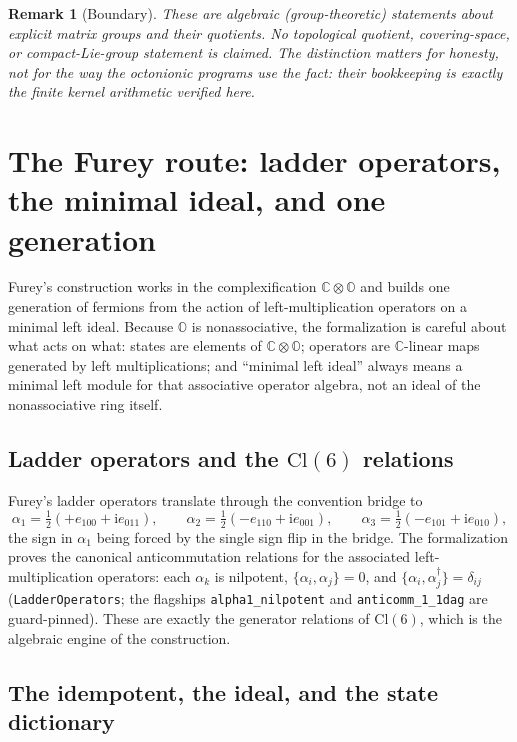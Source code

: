 \documentclass[11pt]{article}
\newcommand{\ii}{\mathrm{i}}
\newcommand{\C}{\mathbb{C}}
\newcommand{\OO}{\mathbb{O}}
\newcommand{\leanname}[1]{\texttt{#1}}
\newtheorem{remark}{Remark}
\begin{document}
\begin{remark}[Boundary]
These are algebraic (group-theoretic) statements about explicit matrix
groups and their quotients.  No topological quotient, covering-space, or
compact-Lie-group statement is claimed.  The distinction matters for
honesty, not for the way the octonionic programs use the fact: their
bookkeeping is exactly the finite kernel arithmetic verified here.
\end{remark}

\section{The Furey route: ladder operators, the minimal ideal, and one
generation}
\label{sec:furey}

Furey's construction \cite{Furey2016,Furey2018} works in the
complexification $\C\otimes\OO$ and builds one generation of fermions
from the action of left-multiplication operators on a minimal left
ideal.  Because $\OO$ is nonassociative, the formalization is careful
about what acts on what: states are elements of $\C\otimes\OO$; operators
are $\C$-linear maps generated by left multiplications; and ``minimal
left ideal'' always means a minimal left module for that associative
operator algebra, not an ideal of the nonassociative ring itself.

\subsection{Ladder operators and the $\mathrm{Cl}(6)$ relations}

Furey's ladder operators translate through the convention bridge to
\[
\alpha_1 = \tfrac{1}{2}(+e_{100} + \ii e_{011}),\qquad
\alpha_2 = \tfrac{1}{2}(-e_{110} + \ii e_{001}),\qquad
\alpha_3 = \tfrac{1}{2}(-e_{101} + \ii e_{010}),
\]
the sign in $\alpha_1$ being forced by the single sign flip in the
bridge.  The formalization proves the canonical anticommutation
relations for the associated left-multiplication operators: each
$\alpha_k$ is nilpotent, $\{\alpha_i, \alpha_j\} = 0$, and
$\{\alpha_i, \alpha_j^\dagger\} = \delta_{ij}$
(\leanname{LadderOperators}; the flagships
\leanname{alpha1\_nilpotent} and \leanname{anticomm\_1\_1dag} are
guard-pinned).  These are exactly the generator relations of
$\mathrm{Cl}(6)$, which is the algebraic engine of the construction.

\subsection{The idempotent, the ideal, and the state dictionary}
\end{document}
